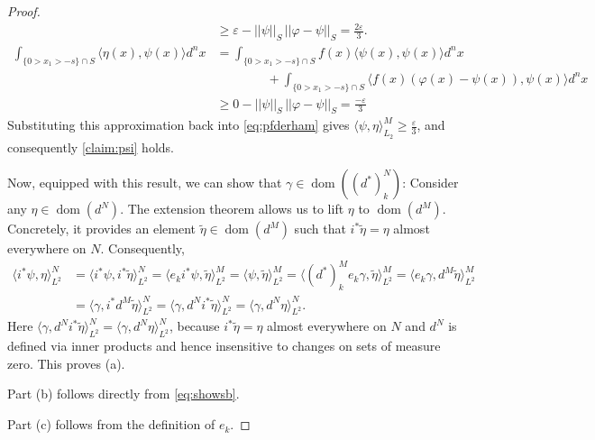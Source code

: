 \documentclass[11pt]{article}
\theoremstyle{definition}
\theoremstyle{remark}
\DeclareMathOperator\dom{dom}
\begin{document}
\begin{proof}
\begin{align*}
        &\ge \varepsilon - ||\psi||_S \, ||\varphi - \psi||_S = \frac{2 \varepsilon}{3} . \\
        \int_{\{0> x_1> -s \} \cap S} \langle \eta(x),\psi(x) \rangle d^n x&=\int_{\{0> x_1> -s \} \cap S} f(x) \langle \psi(x),\psi(x) \rangle d^n x \\
        &\qquad \qquad + \int_{\{0> x_1> -s \} \cap S} \langle f(x) (\varphi(x) - \psi(x)),\psi(x) \rangle d^n x\\
        &\ge 0 -  ||\psi||_S \, ||\varphi - \psi||_S = \frac{ - \varepsilon}{3}
    \end{align*}
    Substituting this approximation back into \cref{eq:pfderham} gives $\langle \psi, \eta \rangle_{L_2}^M \ge \frac{\varepsilon}{3}$, and consequently \cref{claim:psi} holds.

    Now, equipped with this result, we can show that $\gamma \in \dom((d^*)_k^N)$: Consider any $\eta \in \dom(d^N)$. The extension theorem \citep[p.~254]{evans} allows us to lift $\eta$ to $\dom(d^M)$. Concretely, it provides an element $\tilde \eta \in \dom (d^M)$ such that $i^* \tilde \eta = \eta$ almost everywhere on $N$. Consequently,
    \begin{align*}
        \langle i^* \psi, \eta \rangle_{L^2}^N&=  \langle i^* \psi, i^*\tilde\eta \rangle_{L^2}^N = \langle e_k i^* \psi, \tilde\eta \rangle_{L^2}^M = \langle \psi, \tilde\eta \rangle_{L^2}^M = \langle (d^*)^M_k e_k \gamma, \tilde\eta \rangle_{L^2}^M = \langle e_k \gamma, d^M\tilde\eta \rangle_{L^2}^M \\
        &= \langle \gamma, i^* d^M\tilde\eta \rangle_{L^2}^N = \langle \gamma, d^N i^*\tilde\eta \rangle_{L^2}^N = \langle \gamma, d^N \eta \rangle_{L^2}^N.
    \end{align*}
    Here $\langle \gamma, d^N i^*\tilde\eta \rangle_{L^2}^N = \langle \gamma, d^N \eta \rangle_{L^2}^N$, because $i^*\tilde \eta = \eta$ almost everywhere on $N$ and $d^N$ is defined via inner products and hence insensitive to changes on sets of measure zero. This proves (a). 
    
    Part (b) follows directly from \cref{eq:showsb}.
    
    Part (c) follows from the definition of $e_k$.
    

\end{proof}
\end{document}
